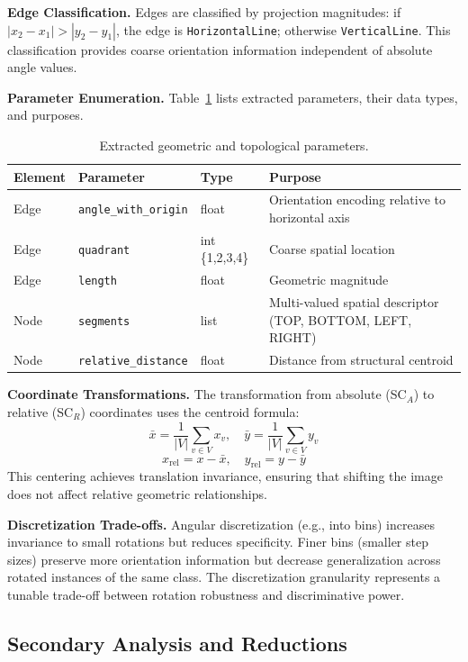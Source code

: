\documentclass[12pt, a4paper]{article}
\begin{document}
\textbf{Edge Classification.} Edges are classified by projection magnitudes: if $|x_2 - x_1| > |y_2 - y_1|$, the edge is \texttt{HorizontalLine}; otherwise \texttt{VerticalLine}. This classification provides coarse orientation information independent of absolute angle values.

\textbf{Parameter Enumeration.} Table~\ref{tab:parameters} lists extracted parameters, their data types, and purposes.

\begin{table}[h]
\centering
\caption{Extracted geometric and topological parameters.}
\label{tab:parameters}
\begin{tabular}{lllp{5cm}}
\toprule
\textbf{Element} & \textbf{Parameter} & \textbf{Type} & \textbf{Purpose} \\
\midrule
Edge & \texttt{angle\_with\_origin} & float & Orientation encoding relative to horizontal axis \\
Edge & \texttt{quadrant} & int \{1,2,3,4\} & Coarse spatial location \\
Edge & \texttt{length} & float & Geometric magnitude \\
Node & \texttt{segments} & list & Multi-valued spatial descriptor (TOP, BOTTOM, LEFT, RIGHT) \\
Node & \texttt{relative\_distance} & float & Distance from structural centroid \\
\bottomrule
\end{tabular}
\end{table}

\textbf{Coordinate Transformations.} The transformation from absolute (SC$_A$) to relative (SC$_R$) coordinates uses the centroid formula:
\[
\bar{x} = \frac{1}{|V|}\sum_{v \in V} x_v, \quad \bar{y} = \frac{1}{|V|}\sum_{v \in V} y_v
\]
\[
x_{\text{rel}} = x - \bar{x}, \quad y_{\text{rel}} = y - \bar{y}
\]
This centering achieves translation invariance, ensuring that shifting the image does not affect relative geometric relationships.

\textbf{Discretization Trade-offs.} Angular discretization (e.g., into bins) increases invariance to small rotations but reduces specificity. Finer bins (smaller step sizes) preserve more orientation information but decrease generalization across rotated instances of the same class. The discretization granularity represents a tunable trade-off between rotation robustness and discriminative power.
\subsection{Secondary Analysis and Reductions}
\end{document}
